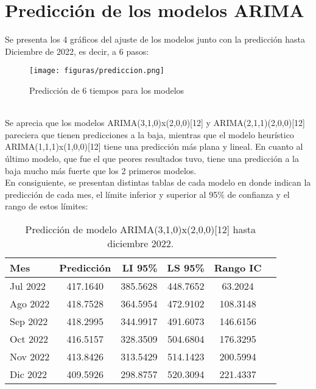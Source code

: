 \documentclass{report}
\begin{document}
\section{Predicción de los modelos ARIMA}\label{Estimación}
Se presenta los 4 gráficos del ajuste de los modelos junto con la predicción hasta Diciembre de 2022, es decir, a 6 pasos:\\
\begin{figure}[htp]
        \centering
    	\texttt{[image: figuras/prediccion.png]}
    	\caption{Predicción de 6 tiempos para los modelos}
    	\label{fig: Figura1}
\end{figure}\\
Se aprecia que los modelos ARIMA(3,1,0)x(2,0,0)[12] y ARIMA(2,1,1)(2,0,0)[12] pareciera que tienen predicciones a la baja, mientras que el modelo heurístico ARIMA(1,1,1)x(1,0,0)[12] tiene una predicción más plana y lineal. En cuanto al último modelo, que fue el que peores resultados tuvo, tiene una predicción a la baja mucho más fuerte que los 2 primeros modelos.\\

En consiguiente, se presentan distintas tablas de cada modelo en donde indican la predicción de cada mes, el límite inferior y superior al 95\% de confianza y el rango de estos límites:\\
\vspace{5cm}

\begin{table}[h!]
  \begin{center}
    \label{tab:table1}
    \begin{tabular}{|l|c|r|c|c|c} 
    \hline
      \textbf{Mes} & \textbf{Predicción} & \textbf{LI 95\%} & \textbf{LS 95\%} & \textbf{Rango IC}\\
      \hline
      Jul 2022 & 417.1640 &385.5628 &448.7652 & 63.2024\\
      \hline
      Ago 2022 & 418.7528 &364.5954 &472.9102 & 108.3148\\
      \hline
      Sep 2022 & 418.2995 &344.9917 &491.6073 & 146.6156\\
      \hline
      Oct 2022 & 416.5157 &328.3509 &504.6804 & 176.3295\\
      \hline
      Nov 2022 & 413.8426 &313.5429 &514.1423 & 200.5994\\
      \hline
      Dic 2022 & 409.5926 &298.8757 &520.3094 & 221.4337\\
      \hline
    \end{tabular}
  \end{center}
  \caption{Predicción de modelo ARIMA(3,1,0)x(2,0,0)[12] hasta diciembre 2022.}
\end{table}\\
\end{document}
